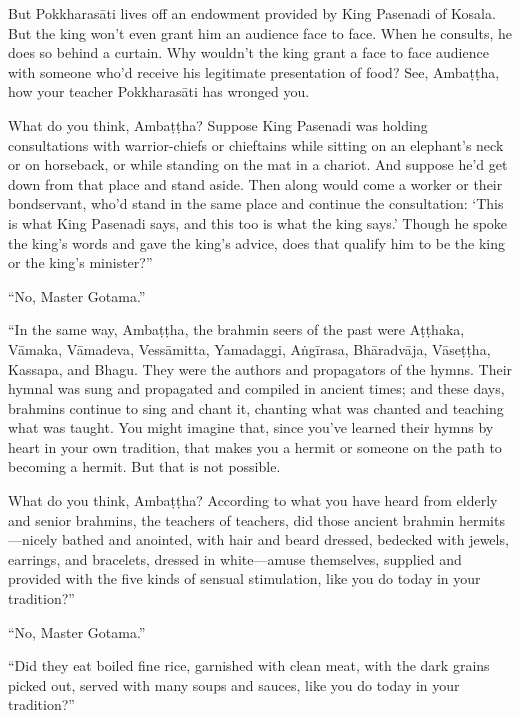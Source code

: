 \documentclass[12pt,openany]{book}%
\begin{document}
But \textsanskrit{Pokkharasāti} lives off an endowment provided by King Pasenadi of Kosala. But the king won’t even grant him an audience face to face. When he consults, he does so behind a curtain. Why wouldn’t the king grant a face to face audience with someone who’d receive his legitimate presentation of food? See, \textsanskrit{Ambaṭṭha}, how your teacher \textsanskrit{Pokkharasāti} has wronged you. 

What do you think, \textsanskrit{Ambaṭṭha}? Suppose King Pasenadi was holding consultations with warrior-chiefs or chieftains while sitting on an elephant’s neck or on horseback, or while standing on the mat in a chariot. And suppose he’d get down from that place and stand aside. Then along would come a worker or their bondservant, who’d stand in the same place and continue the consultation: ‘This is what King Pasenadi says, and this too is what the king says.’ Though he spoke the king’s words and gave the king’s advice, does that qualify him to be the king or the king’s minister?” 

“No, Master Gotama.” 

“In the same way, \textsanskrit{Ambaṭṭha}, the brahmin seers of the past were \textsanskrit{Aṭṭhaka}, \textsanskrit{Vāmaka}, \textsanskrit{Vāmadeva}, \textsanskrit{Vessāmitta}, Yamadaggi, \textsanskrit{Aṅgīrasa}, \textsanskrit{Bhāradvāja}, \textsanskrit{Vāseṭṭha}, Kassapa, and Bhagu. They were the authors and propagators of the hymns. Their hymnal was sung and propagated and compiled in ancient times; and these days, brahmins continue to sing and chant it, chanting what was chanted and teaching what was taught. You might imagine that, since you’ve learned their hymns by heart in your own tradition, that makes you a hermit or someone on the path to becoming a hermit. But that is not possible. 

What do you think, \textsanskrit{Ambaṭṭha}? According to what you have heard from elderly and senior brahmins, the teachers of teachers, did those ancient brahmin hermits—nicely bathed and anointed, with hair and beard dressed, bedecked with jewels, earrings, and bracelets, dressed in white—amuse themselves, supplied and provided with the five kinds of sensual stimulation, like you do today in your tradition?” 

“No, Master Gotama.” 

“Did they eat boiled fine rice, garnished with clean meat, with the dark grains picked out, served with many soups and sauces, like you do today in your tradition?” 
\end{document}
